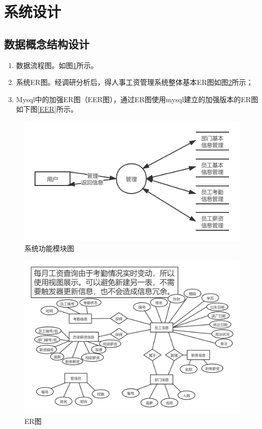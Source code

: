 \documentclass[withoutpreface,bwprint]{cumcmthesis} %
\begin{document}
\section{系统设计}
\subsection{数据概念结构设计}
\begin{enumerate}
	\item 数据流程图。如图\ref{shuju}所示。
	\item 系统ER图。经调研分析后，得人事工资管理系统整体基本ER图如图\ref{ER}所示；
	\item Mysql中的加强ER图（EER图），通过ER图使用mysql建立的加强版本的ER图如下图\ref{EER}所示。
\end{enumerate}
\begin{figure}[H]
    \centering
    \includegraphics[width=1\linewidth]{shuju}
    \caption{系统功能模块图}
    \label{shuju}
\end{figure}
\begin{figure}[H]
    \centering
    \includegraphics[width=1\linewidth]{ERGraph}
    \caption{ER图}
    \label{ER}
\end{figure}
\end{document}
